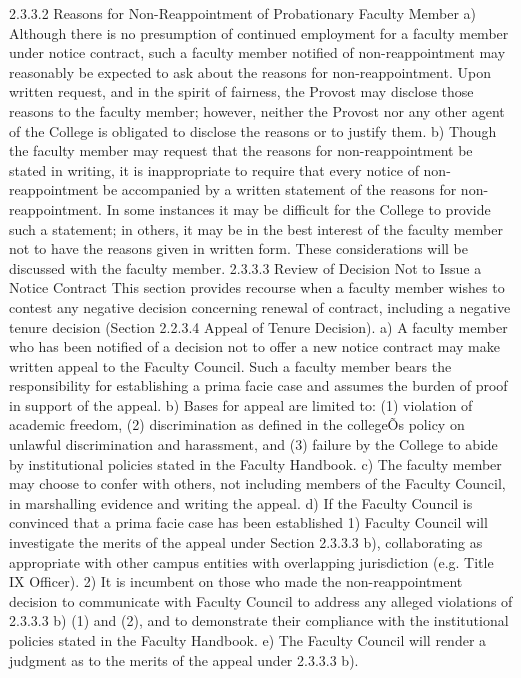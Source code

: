 \documentclass[letterpaper, 11pt]{article}
\begin{document}
	2.3.3.2 Reasons for Non-Reappointment of Probationary Faculty Member
	a) Although there is no presumption of continued employment for a faculty member under notice contract, such a faculty member notified of non-reappointment may reasonably be expected to ask about the reasons for non-reappointment.  Upon written request, and in the spirit of fairness, the Provost may disclose those reasons to the faculty member; however, neither the Provost nor any other agent of the College is obligated to disclose the reasons or to justify them.
	b) Though the faculty member may request that the reasons for non-reappointment be stated in writing, it is inappropriate to require that every notice of non-reappointment be accompanied by a written statement of the reasons for non-reappointment.  In some instances it may be difficult for the College to provide such a statement; in others, it may be in the best interest of the faculty member not to have the reasons given in written form.  These considerations will be discussed with the faculty member.
	2.3.3.3 Review of Decision Not to Issue a Notice Contract
	This section provides recourse when a faculty member wishes to contest any negative decision concerning renewal of contract, including a negative tenure decision (Section 2.2.3.4 Appeal of Tenure Decision).
	a) A faculty member who has been notified of a decision not to offer a new notice contract may make written appeal to the Faculty Council.  Such a faculty member bears the responsibility for establishing a prima facie case and assumes the burden of proof in support of the appeal.
	b) Bases for appeal are limited to: (1) violation of academic freedom, (2) discrimination as defined in the collegeÕs policy on unlawful discrimination and harassment, and (3) failure by the College to abide by institutional policies stated in the Faculty Handbook.
	c) The faculty member may choose to confer with others, not including members of the Faculty Council, in marshalling evidence and writing the appeal.
	d) If the Faculty Council is convinced that a prima facie case has been established
	1) Faculty Council will investigate the merits of the appeal under Section 2.3.3.3 b), collaborating as appropriate with other campus entities with overlapping jurisdiction (e.g. Title IX Officer).
	2) It is incumbent on those who made the non-reappointment decision to communicate with Faculty Council to address any alleged violations of 2.3.3.3 b) (1) and (2), and to demonstrate their compliance with the institutional policies stated in the Faculty Handbook.
	e) The Faculty Council will render a judgment as to the merits of the appeal under 2.3.3.3 b).
\end{document}
